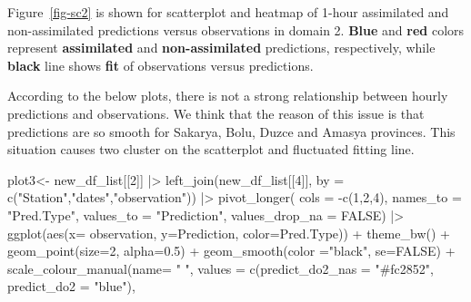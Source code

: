 \documentclass[
  letterpaper,
  DIV=11,
  numbers=noendperiod,
  abstract]{scrartcl}
\newenvironment{Shaded}{\begin{snugshade}}{\end{snugshade}}
\newcommand{\AttributeTok}[1]{\textcolor[rgb]{0.40,0.45,0.13}{#1}}
\newcommand{\ConstantTok}[1]{\textcolor[rgb]{0.56,0.35,0.01}{#1}}
\newcommand{\DecValTok}[1]{\textcolor[rgb]{0.68,0.00,0.00}{#1}}
\newcommand{\FloatTok}[1]{\textcolor[rgb]{0.68,0.00,0.00}{#1}}
\newcommand{\FunctionTok}[1]{\textcolor[rgb]{0.28,0.35,0.67}{#1}}
\newcommand{\NormalTok}[1]{\textcolor[rgb]{0.00,0.23,0.31}{#1}}
\newcommand{\OtherTok}[1]{\textcolor[rgb]{0.00,0.23,0.31}{#1}}
\newcommand{\SpecialCharTok}[1]{\textcolor[rgb]{0.37,0.37,0.37}{#1}}
\newcommand{\StringTok}[1]{\textcolor[rgb]{0.13,0.47,0.30}{#1}}
\begin{document}
Figure~\ref{fig-sc2} is shown for scatterplot and heatmap of 1-hour
assimilated and non-assimilated predictions versus observations in
domain 2. \textbf{Blue} and \textbf{red} colors represent
\textbf{assimilated} and \textbf{non-assimilated} predictions,
respectively, while \textbf{black} line shows \textbf{fit} of
observations versus predictions.

According to the below plots, there is not a strong relationship between
hourly predictions and observations. We think that the reason of this
issue is that predictions are so smooth for Sakarya, Bolu, Duzce and
Amasya provinces. This situation causes two cluster on the scatterplot
and fluctuated fitting line.

\begin{Shaded}
\begin{Highlighting}[]
\NormalTok{plot3}\OtherTok{\textless{}{-}} 
\NormalTok{new\_df\_list[[}\DecValTok{2}\NormalTok{]] }\SpecialCharTok{|\textgreater{}}        
  \FunctionTok{left\_join}\NormalTok{(new\_df\_list[[}\DecValTok{4}\NormalTok{]], }\AttributeTok{by =} \FunctionTok{c}\NormalTok{(}\StringTok{"Station"}\NormalTok{,}\StringTok{"dates"}\NormalTok{,}\StringTok{"observation"}\NormalTok{)) }\SpecialCharTok{|\textgreater{}} 
    \FunctionTok{pivot\_longer}\NormalTok{(}
      \AttributeTok{cols =} \SpecialCharTok{{-}}\FunctionTok{c}\NormalTok{(}\DecValTok{1}\NormalTok{,}\DecValTok{2}\NormalTok{,}\DecValTok{4}\NormalTok{),}
      \AttributeTok{names\_to =} \StringTok{"Pred.Type"}\NormalTok{,}
      \AttributeTok{values\_to =} \StringTok{"Prediction"}\NormalTok{,}
      \AttributeTok{values\_drop\_na =} \ConstantTok{FALSE}\NormalTok{) }\SpecialCharTok{|\textgreater{}}
\FunctionTok{ggplot}\NormalTok{(}\FunctionTok{aes}\NormalTok{(}\AttributeTok{x=}\NormalTok{ observation, }\AttributeTok{y=}\NormalTok{Prediction, }\AttributeTok{color=}\NormalTok{Pred.Type)) }\SpecialCharTok{+}   
  \FunctionTok{theme\_bw}\NormalTok{() }\SpecialCharTok{+}
  \FunctionTok{geom\_point}\NormalTok{(}\AttributeTok{size=}\DecValTok{2}\NormalTok{, }\AttributeTok{alpha=}\FloatTok{0.5}\NormalTok{) }\SpecialCharTok{+}   
  \FunctionTok{geom\_smooth}\NormalTok{(}\AttributeTok{color =}\StringTok{"black"}\NormalTok{, }\AttributeTok{se=}\ConstantTok{FALSE}\NormalTok{) }\SpecialCharTok{+}
  \FunctionTok{scale\_colour\_manual}\NormalTok{(}\AttributeTok{name=} \StringTok{" "}\NormalTok{, }
    \AttributeTok{values =} \FunctionTok{c}\NormalTok{(}\StringTok{\textquotesingle{}predict\_do2\_nas\textquotesingle{}} \OtherTok{=} \StringTok{"\#fc2852"}\NormalTok{,}
               \StringTok{\textquotesingle{}predict\_do2\textquotesingle{}} \OtherTok{=} \StringTok{"blue"}\NormalTok{),}

\end{Highlighting}
\end{Shaded}
\end{document}
